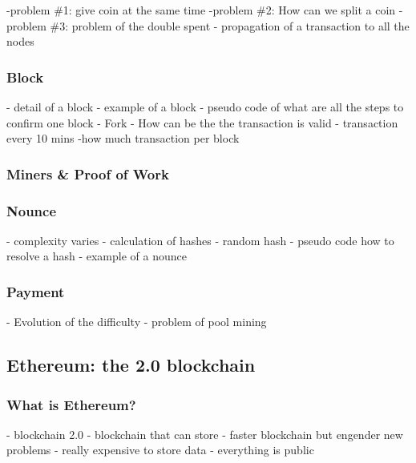 -problem \#1: give coin at the same time 
\newline
-problem \#2: How can we split a coin 
\newline
-problem \#3: problem of the double spent 
- propagation of a transaction to all the nodes
\newline
\subsubsection{Block}
- detail of a block
\newline
- example of a block
\newline
- pseudo code of what are all the steps to confirm one block
\newline
- Fork
\newline
- How can be the the transaction is valid
\newline
- transaction every 10 mins
\newline
-how much transaction per block
\subsubsection{Miners \& Proof of Work}

\subsubsection{Nounce}
- complexity varies
\newline
- calculation of hashes
\newline 
- random hash
\newline
- pseudo code how to resolve a hash
\newline
- example of a nounce
\subsubsection{Payment}
- Evolution of the difficulty
\newline
- problem of pool mining
\subsection{Ethereum: the 2.0 blockchain}
\subsubsection{What is Ethereum?}
- blockchain 2.0
\newline
- blockchain that can store 
\newline
- faster blockchain but engender new problems
\newline
- really expensive to store data
\newline
- everything is public
